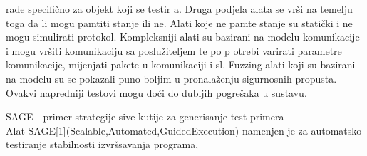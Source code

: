\documentclass[12pt,oneside]{memoir}
\begin{document}
rade specifično za objekt koji se testir
a.
Druga podjela alata se vrši na temelju toga da li mogu pamtiti stanje ili ne. Alati koje ne pamte 
stanje su statički i ne mogu simulirati protokol. Kompleksniji alati su bazirani na modelu 
komunikacije i mogu vršiti komunikaciju sa poslužiteljem te po p
otrebi varirati parametre 
komunikacije, mijenjati pakete u komunikaciji i sl. Fuzzing alati koji su bazirani na modelu su se 
pokazali puno boljim u pronalaženju sigurnosnih propusta. Ovakvi napredniji testovi mogu doći 
do dubljih pogrešaka u sustavu.
\par
SAGE - primer strategije sive kutije za generisanje test primera\\
Alat SAGE[1](Scalable,Automated,GuidedExecution) namenjen je za
automatsko testiranje stabilnosti izvršsavanja programa,
\end{document}
